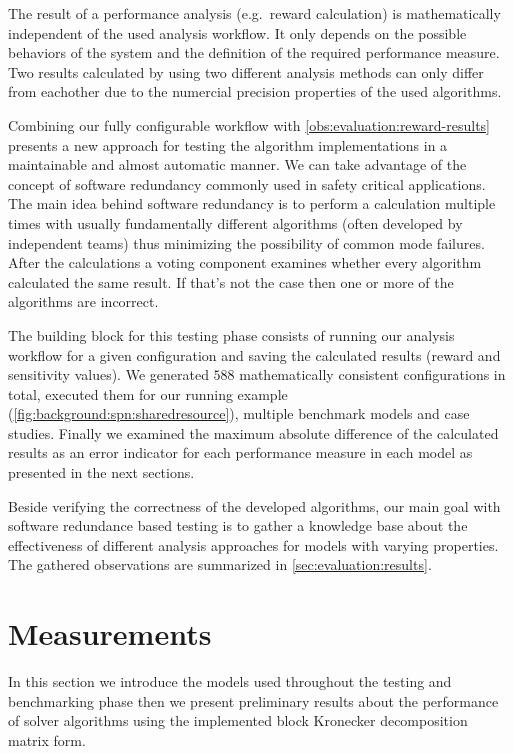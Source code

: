 \begin{obs}
  \label{obs:evaluation:reward-results}
  The result of a performance analysis (e.g.\ reward calculation) is mathematically independent of the used analysis workflow. It only depends on the possible behaviors of the system and the definition of the required performance measure. Two results calculated by using two different analysis methods can only differ from eachother due to the numercial precision properties of the used algorithms.
\end{obs}  

Combining our fully configurable workflow with \cref{obs:evaluation:reward-results} presents a new approach for testing the algorithm implementations in a maintainable and almost automatic manner. We can take advantage of the concept of software redundancy commonly used in safety critical applications. The main idea behind software redundancy is to perform a calculation multiple times with usually fundamentally different algorithms (often developed by independent teams) thus minimizing the possibility of common mode failures. After the calculations a voting component examines whether every algorithm calculated the same result. If that's not the case then one or more of the algorithms are incorrect.

The building block for this testing phase consists of running our analysis workflow for a given configuration and saving the calculated results (reward and sensitivity values). We generated $588$ mathematically consistent configurations in total, executed them for our running example (\cref{fig:background:spn:sharedresource}), multiple benchmark models and case studies. Finally we examined the maximum absolute difference of the calculated results as an error indicator for each performance measure in each model as presented in the next sections.

Beside verifying the correctness of the developed algorithms, our main goal with software redundance based testing is to gather a knowledge base about the effectiveness of different analysis approaches for models with varying properties. The gathered observations are summarized in \cref{sec:evaluation:results}.

\section{Measurements}

In this section we introduce the models used throughout the testing and benchmarking phase then we present preliminary results about the performance of solver algorithms using the implemented block Kronecker decomposition matrix form.

